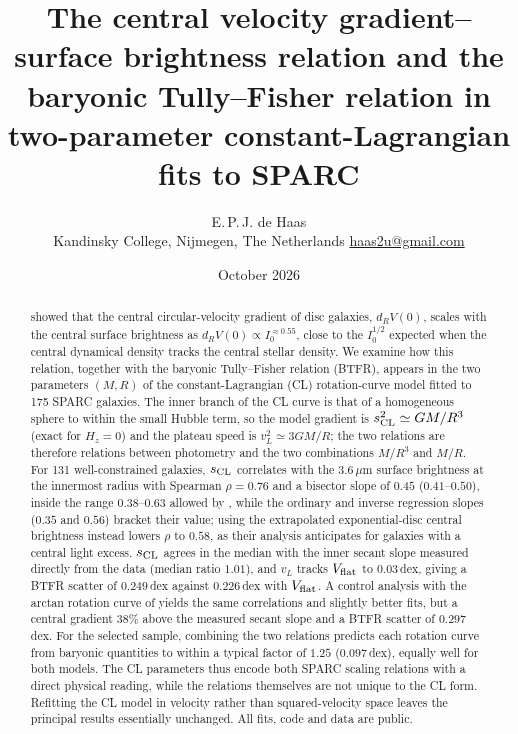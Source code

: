 \documentclass[11pt,a4paper]{article}
\title{\textbf{The central velocity gradient--surface brightness relation and the baryonic Tully--Fisher relation in two-parameter constant-Lagrangian fits to SPARC}}
\author{E.\,P.\,J. de Haas\\[2pt]
\small Kandinsky College, Nijmegen, The Netherlands \quad \href{mailto:haas2u@gmail.com}{haas2u@gmail.com}}
\date{October 2026}
\newcommand{\vL}{v_{\!L}}
\newcommand{\sCL}{s_{\rm CL}}
\newcommand{\Vf}{V_{\rm flat}}
\begin{document}
\maketitle

\begin{abstract}
\noindent
\citet{Lelli2013} showed that the central circular-velocity gradient of disc galaxies, $d_RV(0)$, scales with the central surface brightness as $d_RV(0)\propto I_0^{\approx0.55}$, close to the $I_0^{1/2}$ expected when the central dynamical density tracks the central stellar density. We examine how this relation, together with the baryonic Tully--Fisher relation (BTFR), appears in the two parameters $(M,R)$ of the constant-Lagrangian (CL) rotation-curve model fitted to 175 SPARC galaxies. The inner branch of the CL curve is that of a homogeneous sphere to within the small Hubble term, so the model gradient is $\sCL^2\simeq GM/R^3$ (exact for $H_z=0$) and the plateau speed is $\vL^2\simeq3GM/R$; the two relations are therefore relations between photometry and the two combinations $M/R^3$ and $M/R$. For 131 well-constrained galaxies, $\sCL$ correlates with the 3.6\,$\mu$m surface brightness at the innermost radius with Spearman $\rho=0.76$ and a bisector slope of $0.45$ ($0.41$--$0.50$), inside the range $0.38$--$0.63$ allowed by \citet{Lelli2013}, while the ordinary and inverse regression slopes ($0.35$ and $0.56$) bracket their value; using the extrapolated exponential-disc central brightness instead lowers $\rho$ to $0.58$, as their analysis anticipates for galaxies with a central light excess. $\sCL$ agrees in the median with the inner secant slope measured directly from the data (median ratio $1.01$), and $\vL$ tracks $\Vf$ to $0.03$\,dex, giving a BTFR scatter of $0.249$\,dex against $0.226$\,dex with $\Vf$. A control analysis with the arctan rotation curve of \citet{Courteau1997} yields the same correlations and slightly better fits, but a central gradient 38\% above the measured secant slope and a BTFR scatter of $0.297$\,dex. For the selected sample, combining the two relations predicts each rotation curve from baryonic quantities to within a typical factor of $1.25$ ($0.097$\,dex), equally well for both models. The CL parameters thus encode both SPARC scaling relations with a direct physical reading, while the relations themselves are not unique to the CL form. Refitting the CL model in velocity rather than squared-velocity space leaves the principal results essentially unchanged. All fits, code and data are public.
\end{abstract}
\end{document}
